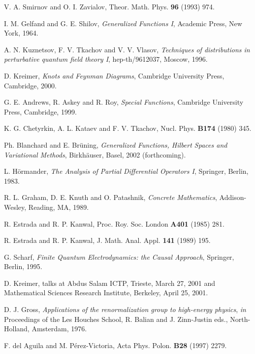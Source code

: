 \documentclass[a4paper,12pt]{article}
\providecommand{\7}{\dagger}           %
\theoremstyle{plain}
\theoremstyle{definition}
\begin{document}
\begin{thebibliography}{53}
V. A. Smirnov and O. I. Zavialov,
Theor. Math. Phys. {\bf 96} (1993) 974.

I. M. Gelfand and G. E. Shilov,
\textit{Generalized Functions I},
Academic Press, New York, 1964.

A. N. Kuznetsov, F. V. Tkachov and V. V. Vlasov,
\textsl{Techniques of distributions in perturbative
quantum field theory I},
hep-th/9612037, Moscow, 1996.

D. Kreimer,
\textit{Knots and Feynman Diagrams},
Cambridge University Press, Cambridge, 2000.

G. E. Andrews, R. Askey and R. Roy,
\textit{Special Functions},
Cambridge University Press, Cambridge, 1999.

K. G. Chetyrkin, A. L. Kataev and F. V. Tkachov,
Nucl. Phys. {\bf B174} (1980) 345.

Ph. Blanchard and E. Br\"uning,
\textit{Generalized Functions, Hilbert Spaces and Variational
Methods},
Birkh\"auser, Basel, 2002 (forthcoming).

L. H\"ormander,
\textit{The Analysis of Partial Differential Operators I},
Springer, Berlin, 1983.

R. L. Graham, D. E. Knuth and O. Patashnik,
\textit{Concrete Mathematics},
Addison-Wesley, Reading, MA, 1989.

R. Estrada and R. P. Kanwal,
Proc. Roy. Soc. London {\bf A401} (1985) 281.

R. Estrada and R. P. Kanwal,
J. Math. Anal. Appl. {\bf 141} (1989) 195.

G. Scharf,
\textit{Finite Quantum Electrodynamics: the Causal Approach},
Springer, Berlin, 1995.

D. Kreimer, talks at Abdus Salam ICTP, Trieste, March 27, 2001
and Mathematical Sciences Research Institute, Berkeley,
April 25, 2001.

D. J. Gross,
\textsl{Applications of the renormalization group to high-energy
physics},
\textit{in} Proceedings of the Les Houches School,
R. Balian and J. Zinn-Justin eds.,
North-Holland, Amsterdam, 1976.

F. del Aguila and M. P\'erez-Victoria,
Acta Phys. Polon. {\bf B28} (1997) 2279.


\end{thebibliography}
\end{document}

